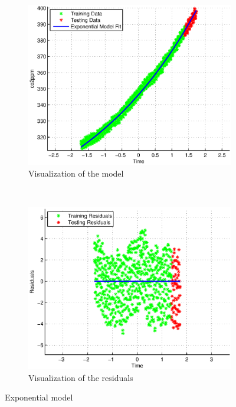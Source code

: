 \documentclass{assignment}
\begin{document}
\begin{figure}
  \centering
  \begin{subfigure}[b]{0.51\textwidth}
     \includegraphics[width=\textwidth]{images/exponential_visualization.eps}
  \caption{Visualization of the model}
  \end{subfigure}%
   ~ %
  \begin{subfigure}[b]{0.51\textwidth}
    \includegraphics[width=\textwidth]{images/exponential_residuals.eps}
  \caption{Visualization of the residuals}
  \end{subfigure}

  \caption{Exponential model}
\label{fig:exponential_model}
\end{figure}
\end{document}
